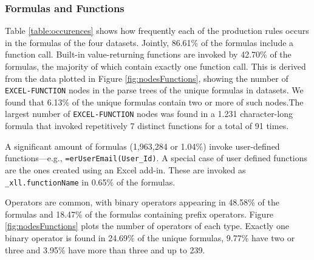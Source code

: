 \documentclass[times]{smrauth}
\begin{document}
\subsubsection{Formulas and Functions}

Table \ref{table:occurences} shows how frequently each of the production rules occurs in the formulas of the four datasets. Jointly, 86.61\% of the formulas include a function call. Built-in value-returning functions are invoked by 42.70\% of the formulas, the majority of which contain exactly one function call. This is derived from the data plotted in Figure \ref{fig:nodesFunctions}, showing the number of \texttt{EXCEL-FUNCTION} nodes in the parse trees of the unique formulas in datasets. We found that 6.13\% of the unique formulas contain two or more of such nodes.The largest number of \texttt{EXCEL-FUNCTION} nodes was found in a 1.231 character-long formula that invoked repetitively 7 distinct functions for a total of 91 times.

A significant amount of formulas (1,963,284	or 1.04\%) invoke user-defined functions---e.g., \texttt{=erUserEmail(User_Id)}. A special case of user defined functions are the ones created using an Excel add-in. These are invoked as \texttt{_xll.functionName} in 0.65\% of the formulas.

Operators are common, with binary operators appearing in 48.58\% of the formulas and 18.47\% of the formulas containing prefix operators. Figure \ref{fig:nodesFunctions} plots the number of operators of each type. Exactly one binary operator is found in 24.69\% of the unique formulas, 9.77\% have two or three and 3.95\% have more than three and up to 239.
\end{document}
